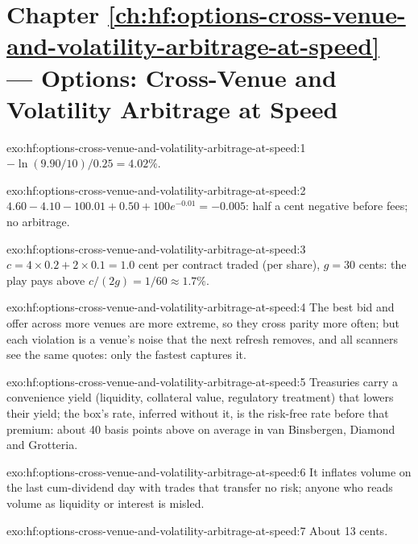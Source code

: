 \section*{Chapter \ref{ch:hf:options-cross-venue-and-volatility-arbitrage-at-speed} --- Options: Cross-Venue and Volatility Arbitrage at Speed}

\begin{solution}{exo:hf:options-cross-venue-and-volatility-arbitrage-at-speed:1}
$-\ln(9.90/10)/0.25=4.02\%$.
\end{solution}

\begin{solution}{exo:hf:options-cross-venue-and-volatility-arbitrage-at-speed:2}
$4.60-4.10-100.01+0.50+100e^{-0.01}=-0.005$: half a cent negative before fees; no arbitrage.
\end{solution}

\begin{solution}{exo:hf:options-cross-venue-and-volatility-arbitrage-at-speed:3}
$c=4\times0.2+2\times0.1=1.0$ cent per contract traded (per share), $g=30$ cents: the play pays above $c/(2g)=1/60\approx1.7\%$.
\end{solution}

\begin{solution}{exo:hf:options-cross-venue-and-volatility-arbitrage-at-speed:4}
The best bid and offer across more venues are more extreme, so they cross parity more often; but each violation is a venue's noise that the next
refresh removes, and all scanners see the same quotes: only the fastest captures it.
\end{solution}

\begin{solution}{exo:hf:options-cross-venue-and-volatility-arbitrage-at-speed:5}
Treasuries carry a convenience yield (liquidity, collateral value, regulatory treatment) that lowers their yield; the box's rate, inferred without
it, is the risk-free rate before that premium: about 40 basis points above on average in van Binsbergen, Diamond and Grotteria.
\end{solution}

\begin{solution}{exo:hf:options-cross-venue-and-volatility-arbitrage-at-speed:6}
It inflates volume on the last cum-dividend day with trades that transfer no risk; anyone who reads volume as liquidity or interest is misled.
\end{solution}

\begin{solution}{exo:hf:options-cross-venue-and-volatility-arbitrage-at-speed:7}
About 13 cents.
\end{solution}

